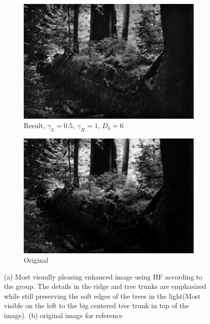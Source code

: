 		\begin{figure}[h!]
			\centering
			\begin{subfigure}[b]{0.5\linewidth}
				\includegraphics[width=0.9\linewidth]{pics/better_res.png}
				\caption{Result, $\gamma_L = 0.5,~\gamma_H = 1$, $D_0 = 6$}
				\label{fig:result}
			\end{subfigure}%
			\begin{subfigure}[b]{0.5\linewidth}
				\includegraphics[width=0.9\linewidth]{pics/orig_pic.png}
				\caption{Original}
				\label{fig:orig2}
			\end{subfigure}
			\label{fig:resComp}
		\caption{(a) Most visually pleasing enhanced image using HF according to the group. The details in the ridge and tree trunks are emphasized while still preserving the soft edges of the trees in the light(Most visible on the left to the big centered tree trunk in top of the image). (b) original image for reference}				
		\end{figure}		

